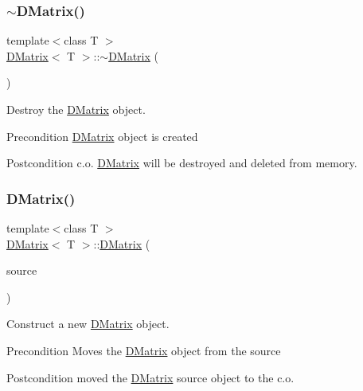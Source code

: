 \subsubsection{\texorpdfstring{$\sim$DMatrix()}{~DMatrix()}}
{\footnotesize\ttfamily template$<$class T $>$ \\
\mbox{\hyperlink{class_d_matrix}{D\+Matrix}}$<$ T $>$\+::$\sim$\mbox{\hyperlink{class_d_matrix}{D\+Matrix}} (\begin{DoxyParamCaption}{ }\end{DoxyParamCaption})}



Destroy the \mbox{\hyperlink{class_d_matrix}{D\+Matrix}} object. 

\begin{DoxyPrecond}{Precondition}
\mbox{\hyperlink{class_d_matrix}{D\+Matrix}} object is created 
\end{DoxyPrecond}
\begin{DoxyPostcond}{Postcondition}
c.\+o. \mbox{\hyperlink{class_d_matrix}{D\+Matrix}} will be destroyed and deleted from memory. 
\end{DoxyPostcond}
\mbox{\label{class_d_matrix_a8a9abe6ba48c4e8e05376bf8f5ae6081}} 
\subsubsection{\texorpdfstring{DMatrix()}{DMatrix()}\hspace{0.1cm}{\footnotesize\ttfamily [5/5]}}
{\footnotesize\ttfamily template$<$class T $>$ \\
\mbox{\hyperlink{class_d_matrix}{D\+Matrix}}$<$ T $>$\+::\mbox{\hyperlink{class_d_matrix}{D\+Matrix}} (\begin{DoxyParamCaption}\item[{\mbox{\hyperlink{class_d_matrix}{D\+Matrix}}$<$ T $>$ \&\&}]{source }\end{DoxyParamCaption})}



Construct a new \mbox{\hyperlink{class_d_matrix}{D\+Matrix}} object. 

\begin{DoxyPrecond}{Precondition}
Moves the \mbox{\hyperlink{class_d_matrix}{D\+Matrix}} object from the source 
\end{DoxyPrecond}
\begin{DoxyPostcond}{Postcondition}
moved the \mbox{\hyperlink{class_d_matrix}{D\+Matrix}} source object to the c.\+o.
\end{DoxyPostcond}

